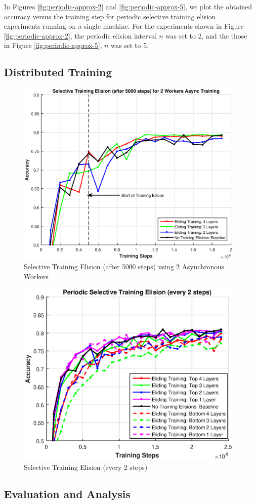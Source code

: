 In Figures \ref{fig:periodic-approx-2} and \ref{fig:periodic-approx-5}, we plot the obtained accuracy versus the training step for periodic selective training elision experiments running on a single machine. For the experiments shown in Figure \ref{fig:periodic-approx-2}, the periodic elision interval $n$ was set to 2, and the those in Figure \ref{fig:periodic-approx-5}, $n$ was set to 5. 

\subsection{Distributed Training}




\begin{figure}[t]
	\centering
	\includegraphics[width=0.8\columnwidth]{figures/approx-2workers.eps}
	\caption{Selective Training Elision (after 5000 steps) using 2 Asynchronous Workers}
	\label{fig:approx-2-workers}
\end{figure}

\begin{figure}[t]
	\centering
	\includegraphics[width=0.8\columnwidth]{figures/combined_bottom_top_elisions.eps}
	\caption{Selective Training Elision (every 2 steps)}
	\label{fig:combined-alt}
\end{figure}
\subsection{Evaluation and Analysis}
